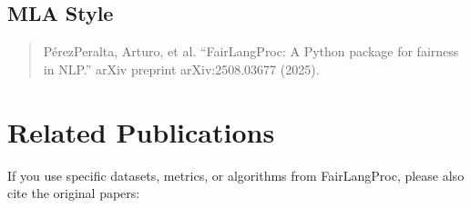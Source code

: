 \documentclass[letterpaper,10pt,english]{sphinxmanual}
\begin{document}
\subsection{MLA Style}
\label{\detokenize{citation:mla-style}}\begin{quote}

\sphinxAtStartPar
Pérez\sphinxhyphen{}Peralta, Arturo, et al. “FairLangProc: A Python package for fairness in NLP.” arXiv preprint arXiv:2508.03677 (2025).
\end{quote}


\section{Related Publications}
\label{\detokenize{citation:related-publications}}
\sphinxAtStartPar
If you use specific datasets, metrics, or algorithms from FairLangProc, please also cite the original papers:
\end{document}
